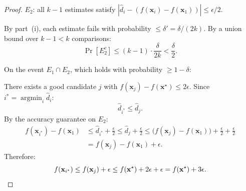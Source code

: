 \begin{proof}
$E_2$: all $k-1$ estimates satisfy $|\hat{d}_i - (f(\mathbf{x}_i) - f(\mathbf{x}_1))| \leq \epsilon/2$.

By part~(i), each estimate fails with probability $\leq \delta' = \delta/(2k)$. By a union bound over $k-1 < k$ comparisons:
\[
\Pr[E_2^c] \leq (k-1) \cdot \frac{\delta}{2k} < \frac{\delta}{2}.
\]

On the event $E_1 \cap E_2$, which holds with probability $\geq 1 - \delta$:

There exists a good candidate $j$ with $f(\mathbf{x}_j) - f(\mathbf{x}^\star) \leq 2\epsilon$. Since $i^* = \operatorname{argmin}_i \hat{d}_i$:
\[
\hat{d}_{i^*} \leq \hat{d}_j.
\]
By the accuracy guarantee on $E_2$:
\begin{align*}
f(\mathbf{x}_{i^*}) - f(\mathbf{x}_1) &\leq \hat{d}_{i^*} + \frac{\epsilon}{2} \leq \hat{d}_j + \frac{\epsilon}{2} \leq \bigl(f(\mathbf{x}_j) - f(\mathbf{x}_1)\bigr) + \frac{\epsilon}{2} + \frac{\epsilon}{2} \\
&= f(\mathbf{x}_j) - f(\mathbf{x}_1) + \epsilon.
\end{align*}
Therefore:
\[
f(\mathbf{x}_{i^*}) \leq f(\mathbf{x}_j) + \epsilon \leq f(\mathbf{x}^\star) + 2\epsilon + \epsilon = f(\mathbf{x}^\star) + 3\epsilon. \qedhere
\]
\end{proof}

